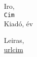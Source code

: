 \begin{thebibliography}{9}

	Iro,
	\\\texttt{Cim}\\
	Kiadó, év
	
	Leiras,
	\\\url{urlcim}

\end{thebibliography}